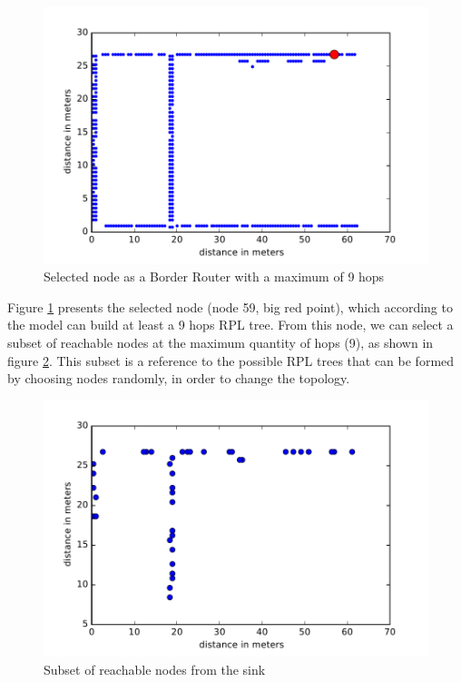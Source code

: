 \begin{figure}[]
	\centering
	\includegraphics[width=0.8 \columnwidth]{chapters/inter-node.images/grenoble-sink-node.pdf}
	\caption{Selected node as a Border Router with a maximum of 9 hops} \label{fig:GrenobleSinkNode}
\end{figure}

Figure \ref{fig:GrenobleSinkNode} presents the selected node (node 59, big red point), which according to the model can build at least a 9 hops RPL tree.
From this node, we can select a subset of reachable nodes at the maximum quantity of hops (9), as shown in figure \ref{fig:GrenobleReachable}.
This subset is a reference to the possible RPL trees that can be formed by choosing nodes randomly, in order to change the topology.

\begin{figure}[]
	\centering
	\includegraphics[width=0.8 \columnwidth]{chapters/inter-node.images/grenoble-reachable-m3.pdf}
	\caption{Subset of reachable nodes from the sink} \label{fig:GrenobleReachable}
\end{figure}

